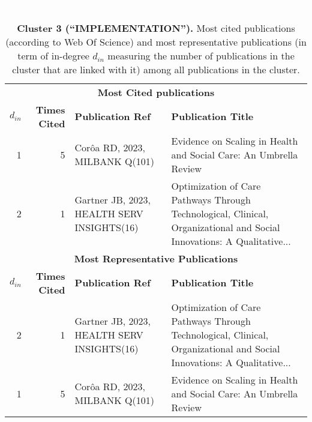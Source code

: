 \documentclass[a4paper,11pt]{report}
\begin{document}
\begin{landscape}
\begin{table}[!ht]
\caption*{{\bf Cluster 3 (``IMPLEMENTATION'').} Most cited publications (according to Web Of Science) and most representative publications (in term of in-degree $d_{in}$ measuring the number of publications in the cluster that are linked with it) among all publications in the cluster.}
\textcolor{white}{aa}\\
{\scriptsize\begin{tabular}{|r r p{7cm} p{17cm}|}
\hline
\multicolumn{4}{|c|}{{\bf Most Cited publications}}\\
{\bf $d_{in}$} & {\bf Times Cited} & {\bf Publication Ref} & {\bf Publication Title} \\
1 & 5 & Corôa RD, 2023, MILBANK Q(101) & Evidence on Scaling in Health and Social Care: An Umbrella Review\\
2 & 1 & Gartner JB, 2023, HEALTH SERV INSIGHTS(16) & Optimization of Care Pathways Through Technological, Clinical, Organizational and Social Innovations: A Qualitative...\\
\hline
\hline
\multicolumn{4}{|c|}{{\bf Most Representative Publications}}\\
{\bf $d_{in}$} & {\bf Times Cited} & {\bf Publication Ref} & {\bf Publication Title} \\
2 & 1 & Gartner JB, 2023, HEALTH SERV INSIGHTS(16) & Optimization of Care Pathways Through Technological, Clinical, Organizational and Social Innovations: A Qualitative...\\
1 & 5 & Corôa RD, 2023, MILBANK Q(101) & Evidence on Scaling in Health and Social Care: An Umbrella Review\\
\hline
\end{tabular}
}
\end{table}

\clearpage


\end{landscape}
\end{document}
